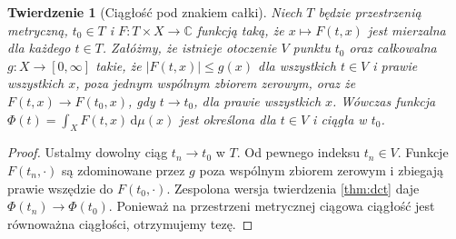 \documentclass[11pt,a4paper,oneside]{book}
\numberwithin{equation}{chapter}
\theoremstyle{plain}
\newtheorem{twierdzenie}{Twierdzenie}[chapter]
\theoremstyle{definition}
\theoremstyle{remark}
\begin{document}
\begin{twierdzenie}[Ciągłość pod znakiem całki]
\label{thm:parameter-continuity}
Niech $T$ będzie przestrzenią metryczną, $t_0\in T$
i $F:T\times X\to\mathbb C$ funkcją taką, że
$x\mapsto F(t,x)$ jest mierzalna dla każdego $t\in T$.
Załóżmy, że istnieje otoczenie $V$ punktu $t_0$
oraz całkowalna $g:X\to[0,\infty]$ takie, że
$|F(t,x)|\le g(x)$ dla wszystkich $t\in V$ i
prawie wszystkich $x$, poza jednym wspólnym zbiorem
zerowym, oraz że $F(t,x)\to F(t_0,x)$, gdy
$t\to t_0$, dla prawie wszystkich $x$.
Wówczas funkcja
$\Phi(t)=\int_XF(t,x)\,\mathrm d\mu(x)$
jest określona dla $t\in V$ i ciągła w $t_0$.
\end{twierdzenie}
\begin{proof}
Ustalmy dowolny ciąg $t_n\to t_0$ w $T$.
Od pewnego indeksu $t_n\in V$. Funkcje
$F(t_n,\cdot)$ są zdominowane przez $g$ poza
wspólnym zbiorem zerowym i zbiegają prawie wszędzie
do $F(t_0,\cdot)$. Zespolona wersja twierdzenia
\ref{thm:dct} daje $\Phi(t_n)\to\Phi(t_0)$.
Ponieważ na przestrzeni metrycznej ciągowa
ciągłość jest równoważna ciągłości, otrzymujemy tezę.
\end{proof}
\end{document}
